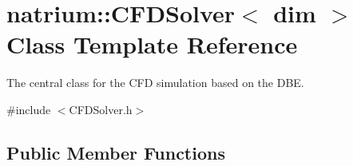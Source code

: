 \hypertarget{classnatrium_1_1CFDSolver}{\section{natrium\-:\-:C\-F\-D\-Solver$<$ dim $>$ Class Template Reference}
\label{classnatrium_1_1CFDSolver}
}


The central class for the C\-F\-D simulation based on the D\-B\-E.  




{\ttfamily \#include $<$C\-F\-D\-Solver.\-h$>$}

\subsection*{Public Member Functions}
